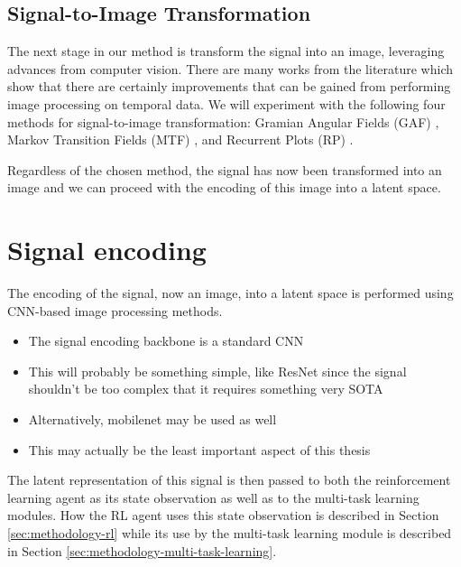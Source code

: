 \subsection{Signal-to-Image Transformation}\label{sec:methodology-signal-to-image}


The next stage in our method is transform the signal into an image, leveraging advances from computer vision.
There are many works from the literature which show that there are certainly improvements that can be gained from performing image processing on temporal data.
We will experiment with the following four methods for signal-to-image transformation: Gramian Angular Fields (GAF) \cite{wang2015imaging}, Markov Transition Fields (MTF) \cite{wang2015imaging}, and Recurrent Plots (RP) \cite{eckmann1995recurrence}.

Regardless of the chosen method, the signal has now been transformed into an image and we can proceed with the encoding of this image into a latent space.

\section{Signal encoding}\label{sec:methodology-signal-encoding}

The encoding of the signal, now an image, into a latent space is performed using CNN-based image processing methods.

\begin{itemize}
	\item The signal encoding backbone is a standard CNN
	\item This will probably be something simple, like ResNet since the signal shouldn't be too complex that it requires something very SOTA
	\item Alternatively, mobilenet may be used as well
	\item This may actually be the least important aspect of this thesis
\end{itemize}

The latent representation of this signal is then passed to both the reinforcement learning agent as its state observation as well as to the multi-task learning modules.
How the RL agent uses this state observation is described in Section \ref{sec:methodology-rl} while its use by the multi-task learning module is described in Section \ref{sec:methodology-multi-task-learning}.


